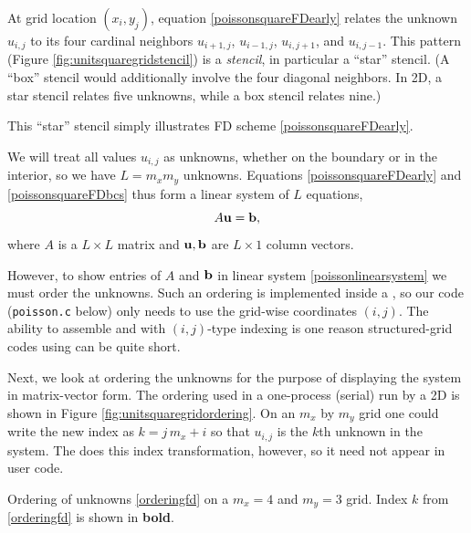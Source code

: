 At grid location $(x_i,y_j)$, equation \eqref{poissonsquareFDearly} relates the unknown $u_{i,j}$ to its four cardinal neighbors $u_{i+1,j}$, $u_{i-1,j}$, $u_{i,j+1}$, and $u_{i,j-1}$.  This pattern (Figure \ref{fig:unitsquaregridstencil}) is a \emph{stencil}, in particular a ``star'' stencil.  (A ``box'' stencil would additionally involve the four diagonal neighbors.  In 2D, a star stencil relates five unknowns, while a box stencil relates nine.)

\begin{marginfigure}

\caption{This ``star'' stencil simply illustrates FD scheme \eqref{poissonsquareFDearly}.}
\label{fig:unitsquaregridstencil}
\end{marginfigure}

We will treat all values $u_{i,j}$ as unknowns, whether on the boundary or in the interior, so we have $L=m_x m_y$ unknowns.  Equations \eqref{poissonsquareFDearly} and \eqref{poissonsquareFDbcs} thus form a linear system of $L$ equations,
\begin{equation}
A \mathbf{u} = \mathbf{b}, \label{poissonlinearsystem}
\end{equation}
where $A$ is a $L\times L$ matrix and $\mathbf{u},\mathbf{b}$ are $L\times 1$ column vectors.

However, to show entries of $A$ and $\mathbf{b}$ in linear system \eqref{poissonlinearsystem} we must order the unknowns.  Such an ordering is implemented inside a \PETSc \pDMDA, so our code (\texttt{poisson.c} below) only needs to use the grid-wise coordinates $(i,j)$.  The ability to assemble \pMats and \pVecs with $(i,j)$-type indexing is one reason structured-grid codes using \pDMDA can be quite short.

Next, we look at ordering the unknowns for the purpose of displaying the system in matrix-vector form.  The ordering used in a one-process (serial) run by a 2D \pDMDA is shown in Figure \ref{fig:unitsquaregridordering}.  On an $m_x$ by $m_y$ grid one could write the new index as $k = j\,m_x + i$ so that $u_{i,j}$ is the $k$th unknown in the system.  The \pDMDA does this index transformation, however, so it need not appear in user code.

\begin{marginfigure}

\caption{Ordering of unknowns \eqref{orderingfd} on a $m_x=4$ and $m_y=3$ grid.  Index $k$ from \eqref{orderingfd} is shown in \textbf{bold}.}
\label{fig:unitsquaregridordering}
\end{marginfigure}

